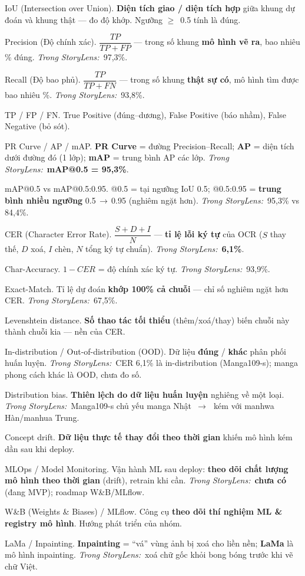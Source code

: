 \documentclass[11pt]{article}
\newcommand{\arr}{\,\ensuremath{\rightarrow}\,}
\newcommand{\gte}{\ensuremath{\geq}}
\newcommand{\insl}{\textit{\textcolor{steel}{Trong StoryLens:}}\ }
\begin{document}
\begin{terms}
\item[IoU (Intersection over Union).] \textbf{Diện tích giao / diện tích hợp} giữa khung dự đoán và khung thật --- đo độ khớp. Ngưỡng \gte\ 0.5 tính là đúng.
\item[Precision (Độ chính xác).] $\dfrac{TP}{TP+FP}$ --- trong số khung \textbf{mô hình vẽ ra}, bao nhiêu \% đúng. \insl 97,3\%.
\item[Recall (Độ bao phủ).] $\dfrac{TP}{TP+FN}$ --- trong số khung \textbf{thật sự có}, mô hình tìm được bao nhiêu \%. \insl 93,8\%.
\item[TP / FP / FN.] True Positive (đúng--dương), False Positive (báo nhầm), False Negative (bỏ sót).
\item[PR Curve / AP / mAP.] \textbf{PR Curve} = đường Precision--Recall; \textbf{AP} = diện tích dưới đường đó (1 lớp); \textbf{mAP} = trung bình AP các lớp. \insl \textbf{mAP@0.5 = 95,3\%}.
\item[mAP@0.5 vs mAP@0.5:0.95.] @0.5 = tại ngưỡng IoU 0.5; @0.5:0.95 = \textbf{trung bình nhiều ngưỡng} 0.5\arr0.95 (nghiêm ngặt hơn). \insl 95,3\% vs 84,4\%.
\item[CER (Character Error Rate).] $\dfrac{S+D+I}{N}$ --- \textbf{tỉ lệ lỗi ký tự} của OCR ($S$ thay thế, $D$ xoá, $I$ chèn, $N$ tổng ký tự chuẩn). \insl \textbf{6,1\%}.
\item[Char-Accuracy.] $1 - CER$ = độ chính xác ký tự. \insl 93,9\%.
\item[Exact-Match.] Tỉ lệ dự đoán \textbf{khớp 100\% cả chuỗi} --- chỉ số nghiêm ngặt hơn CER. \insl 67,5\%.
\item[Levenshtein distance.] \textbf{Số thao tác tối thiểu} (thêm/xoá/thay) biến chuỗi này thành chuỗi kia --- nền của CER.
\item[In-distribution / Out-of-distribution (OOD).] Dữ liệu \textbf{đúng} / \textbf{khác} phân phối huấn luyện. \insl CER 6,1\% là in-distribution (Manga109-s); manga phong cách khác là OOD, chưa đo số.
\item[Distribution bias.] \textbf{Thiên lệch do dữ liệu huấn luyện} nghiêng về một loại. \insl Manga109-s chủ yếu manga Nhật \arr\ kém với manhwa Hàn/manhua Trung.
\item[Concept drift.] \textbf{Dữ liệu thực tế thay đổi theo thời gian} khiến mô hình kém dần sau khi deploy.
\item[MLOps / Model Monitoring.] Vận hành ML sau deploy: \textbf{theo dõi chất lượng mô hình theo thời gian} (drift), retrain khi cần. \insl \textbf{chưa có} (đang MVP); roadmap W\&B/MLflow.
\item[W\&B (Weights \& Biases) / MLflow.] Công cụ \textbf{theo dõi thí nghiệm ML \& registry mô hình}. Hướng phát triển của nhóm.
\item[LaMa / Inpainting.] \textbf{Inpainting} = ``vá'' vùng ảnh bị xoá cho liền nền; \textbf{LaMa} là mô hình inpainting. \insl xoá chữ gốc khỏi bong bóng trước khi vẽ chữ Việt.
\end{terms}
\end{document}
